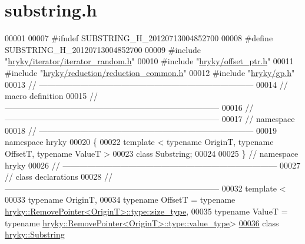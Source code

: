 \hypertarget{substring_8h_source}{\section{substring.\-h}
}

\begin{DoxyCode}
00001 
00007 \textcolor{preprocessor}{#ifndef SUBSTRING\_H\_20120713004852700}
00008 \textcolor{preprocessor}{}\textcolor{preprocessor}{#define SUBSTRING\_H\_20120713004852700}
00009 \textcolor{preprocessor}{}\textcolor{preprocessor}{#include "\hyperlink{iterator__random_8h}{hryky/iterator/iterator_random.h}"}
00010 \textcolor{preprocessor}{#include "\hyperlink{offset__ptr_8h}{hryky/offset_ptr.h}"}
00011 \textcolor{preprocessor}{#include "\hyperlink{reduction__common_8h}{hryky/reduction/reduction_common.h}"}
00012 \textcolor{preprocessor}{#include "\hyperlink{gp_8h}{hryky/gp.h}"}
00013 \textcolor{comment}{//
      ------------------------------------------------------------------------------}
00014 \textcolor{comment}{// macro definition}
00015 \textcolor{comment}{//
      ------------------------------------------------------------------------------}
00016 \textcolor{comment}{//
      ------------------------------------------------------------------------------}
00017 \textcolor{comment}{// namespace}
00018 \textcolor{comment}{//
      ------------------------------------------------------------------------------}
00019 \textcolor{keyword}{namespace }hryky
00020 \{
00022     \textcolor{keyword}{template} < \textcolor{keyword}{typename} OriginT, \textcolor{keyword}{typename} OffsetT, \textcolor{keyword}{typename} ValueT >
00023     \textcolor{keyword}{class }Substring;
00024 
00025 \} \textcolor{comment}{// namespace hryky}
00026 \textcolor{comment}{//
      ------------------------------------------------------------------------------}
00027 \textcolor{comment}{// class declarations}
00028 \textcolor{comment}{//
      ------------------------------------------------------------------------------}
00032 \textcolor{comment}{}\textcolor{keyword}{template} <
00033     \textcolor{keyword}{typename} OriginT,
00034     \textcolor{keyword}{typename} OffsetT = \textcolor{keyword}{typename} \hyperlink{classhryky_1_1_remove_pointer}{hryky::RemovePointer<OriginT>::type::size_type},
00035     \textcolor{keyword}{typename} ValueT = \textcolor{keyword}{typename} \hyperlink{classhryky_1_1_remove_pointer}{hryky::RemovePointer<OriginT>::type::value_type}>
\hypertarget{substring_8h_source_l00036}{}\hyperlink{classhryky_1_1_substring}{00036} \textcolor{keyword}{class }\hyperlink{classhryky_1_1_substring}{hryky::Substring}

\end{DoxyCode}
